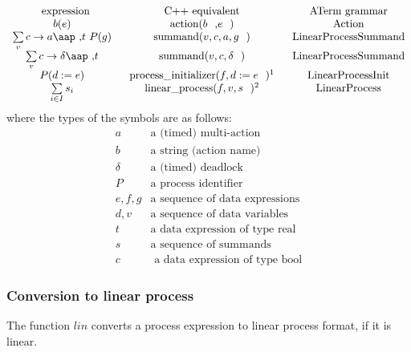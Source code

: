 \documentclass{article}
\begin{document}
\[
\begin{array}{ccc}
\text{expression} & \text{C++ equivalent} & \text{ATerm grammar} \\ 
b(e) & \text{action(}b\text{,}e\text{)} & \text{Action} \\ 
\sum\limits_{v}c\rightarrow a\mbox{\aap ,}t\ P(g) & \text{summand(}v,c,a,g%
\text{)} & \text{LinearProcessSummand} \\ 
\sum\limits_{v}c\rightarrow \delta \mbox{\aap ,}t & \text{summand(}%
v,c,\delta \text{)} & \text{LinearProcessSummand} \\ 
P(d:=e) & \text{process\_initializer(}f,d:=e\text{)\QQfnmark{%
Here $f$ is a superset of the free variables appearing in $e$.}} & \text{%
LinearProcessInit} \\ 
\sum\limits_{i\in I}s_{i} & \text{linear\_process(}f,v,s\text{)\QQfnmark{%
Here $s=[s_{1},\cdots ,s_{n}]$ is a sequence of summands, $v$ is the
sequence of process parameters of the corresponding process, and $f$ is a
sequence of free variables appearing in $s$.}} & \text{LinearProcess}%
\end{array}%
\QQfntext{-1}{
Here $f$ is a superset of the free variables appearing in $e$.}
\QQfntext{1}{
Here $s=[s_{1},\cdots ,s_{n}]$ is a sequence of summands, $v$ is the
sequence of process parameters of the corresponding process, and $f$ is a
sequence of free variables appearing in $s$.}
\]%
where the types of the symbols are as follows:%
\[
\begin{array}{cl}
a & \text{a (timed) multi-action} \\ 
b & \text{a string (action name)} \\ 
\delta & \text{a (timed) deadlock} \\ 
P & \text{a process identifier} \\ 
e,f,g & \text{a sequence of data expressions} \\ 
d,v & \text{a sequence of data variables} \\ 
t & \text{a data expression of type real} \\ 
s & \text{a sequence of summands} \\ 
c & \text{ a data expression of type bool}%
\end{array}%
\]

\subsubsection{Conversion to linear process}

The function $lin$ converts a process expression to linear process format,
if it is linear.
\end{document}

